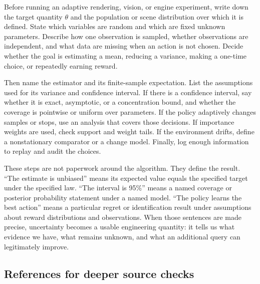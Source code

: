 \hypertarget{03-visual-computing-i-ch012-an-experiment-design-checklist-in-the-language-of-science}{}

Before running an adaptive rendering, vision, or engine experiment, write down the target quantity \(\theta\) and the population or scene distribution over which it is defined. State which variables are random and which are fixed unknown parameters. Describe how one observation is sampled, whether observations are independent, and what data are missing when an action is not chosen. Decide whether the goal is estimating a mean, reducing a variance, making a one-time choice, or repeatedly earning reward.

Then name the estimator and its finite-sample expectation. List the assumptions used for its variance and confidence interval. If there is a confidence interval, say whether it is exact, asymptotic, or a concentration bound, and whether the coverage is pointwise or uniform over parameters. If the policy adaptively changes samples or stops, use an analysis that covers those decisions. If importance weights are used, check support and weight tails. If the environment drifts, define a nonstationary comparator or a change model. Finally, log enough information to replay and audit the choices.

These steps are not paperwork around the algorithm. They define the result. ``The estimate is unbiased'' means its expected value equals the specified target under the specified law. ``The interval is 95\%'' means a named coverage or posterior probability statement under a named model. ``The policy learns the best action'' means a particular regret or identification result under assumptions about reward distributions and observations. When those sentences are made precise, uncertainty becomes a usable engineering quantity: it tells us what evidence we have, what remains unknown, and what an additional query can legitimately improve.

\subsection{References for deeper source checks}\label{03-visual-computing-i-ch012-references-for-deeper-source-checks}

\hypertarget{03-visual-computing-i-ch012-references-for-deeper-source-checks}{}

